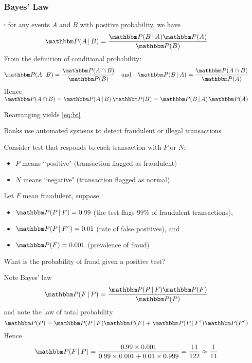 \begin{frame}\frametitle{Bayes' Law}
    
    \vspace{2em}
    : for any events $A$ and $B$ with positive
    probability, we have
    \begin{equation}
        \label{eq:bt}
        \PP(A \given B) = \frac{\PP(B \given A) \PP(A)}{\PP(B)}
    \end{equation}
    \Prf 
    From the definition of conditional probability:
    $$
        \PP(A \given B)=\frac{\PP(A \cap B)}{\PP(B)}
        \quad \text{and} \quad
        \PP(B \given A) = \frac{\PP(A \cap B)}{\PP(A)}
    $$
    Hence
        $\PP(A \cap B) = \PP(A \given B)\, \PP(B) = \PP(B \given A)\, \PP(A)$
    
    Rearranging yields \eqref{eq:bt}
    
\end{frame}

\begin{frame}

    \vspace{2em}
    \Eg
    Banks use automated systems to detect fraudulent or illegal
    transactions
    
    Consider test that responds to each transaction with $P$
    or $N$:
    \begin{itemize}
        \item $P$ means ``positive" (transaction flagged as fraudulent)
        \item $N$ means ``negative" (transaction flagged as normal)
    \end{itemize}
    
    Let $F$ mean fraudulent, suppose
    \begin{itemize}
        \item $\PP( P \given F) = 0.99$ (the test flags 99\% of fraudulent
            transactions),
        \item $\PP( P \given F^c ) = 0.01$ (rate of false positives), and
        \item $\PP( F ) = 0.001$  (prevalence of fraud)
    \end{itemize}
\end{frame}

\begin{frame}

    \vspace{2em}
    What is the probability of fraud given a positive test?
    
    Note Bayes' law
    $$
        \PP(F \,|\, P) = \frac{\PP(P \given F)\PP(F)}{\PP(P)}
    $$
    and note the law of total probability 
        $$
        \PP(P) = \PP(P \given F) \PP(F) + \PP(P \given F^c) \PP(F^c)
        $$
    Hence
    $$
        \PP(F \,|\, P) 
        = \frac{0.99 \times 0.001}{0.99 \times 0.001 + 0.01 \times 0.999}
        = \frac{11}{122}
        \approx \frac{1}{11}
    $$
    
\end{frame}

